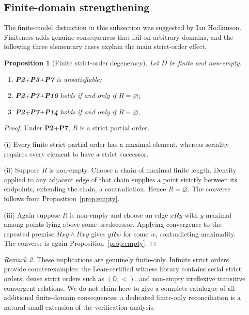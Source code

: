 \documentclass[11pt,a4paper,reqno]{amsart}
\newtheorem{proposition}{Proposition}[section]
\theoremstyle{definition}
\theoremstyle{remark}
\newtheorem{remark}[proposition]{Remark}
\newcommand{\prop}[1]{\textbf{P#1}}
\begin{document}
\subsection{Finite-domain strengthening}\label{subsec:finite}

The finite-model distinction in this subsection was suggested by Ian Hodkinson.
Finiteness adds genuine consequences that fail on arbitrary domains, and the
following three elementary cases explain the main strict-order effect.

\begin{proposition}[Finite strict-order degeneracy]\label{prop:finite-strict}
Let $D$ be finite and non-empty.
\begin{enumerate}[label=(\roman*),noitemsep]
\item \prop{2}+\prop{3}+\prop{7} is unsatisfiable;
\item \prop{2}+\prop{7}+\prop{10} holds if and only if $R=\varnothing$;
\item \prop{2}+\prop{7}+\prop{14} holds if and only if $R=\varnothing$.
\end{enumerate}
\end{proposition}
\begin{proof}
Under \prop{2}+\prop{7}, $R$ is a strict partial order.

(i) Every finite strict partial order has a maximal element, whereas seriality
requires every element to have a strict successor.

(ii) Suppose $R$ is non-empty.  Choose a chain of maximal finite length.
Density applied to any adjacent edge of that chain supplies a point strictly
between its endpoints, extending the chain, a contradiction.  Hence
$R=\varnothing$.  The converse follows from Proposition~\ref{prop:empty}.

(iii) Again suppose $R$ is non-empty and choose an edge $xRy$ with $y$
maximal among points lying above some predecessor.  Applying convergence to
the repeated premise $Rxy\wedge Rxy$ gives $yRw$ for some $w$, contradicting
maximality.  The converse is again Proposition~\ref{prop:empty}.
\end{proof}

\begin{remark}
These implications are genuinely finite-only.  Infinite strict orders provide
counterexamples: the Lean-certified witness library contains serial strict
orders, dense strict orders such as $(\mathbb{Q},<)$, and non-empty
irreflexive transitive convergent relations.  We do not claim here to give a
complete catalogue of all additional finite-domain consequences; a dedicated
finite-only reconciliation is a natural small extension of the verification
analysis.
\end{remark}
\end{document}
